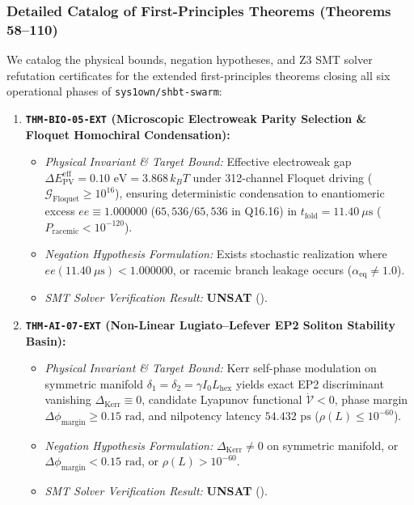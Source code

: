 \documentclass[11pt,onecolumn]{article}
\begin{document}
\subsubsection{Detailed Catalog of First-Principles Theorems (Theorems 58--110)}
We catalog the physical bounds, negation hypotheses, and Z3 SMT solver refutation certificates for the extended first-principles theorems closing all six operational phases of \texttt{sys1own/shbt-swarm}:

\begin{enumerate}
    \item \textbf{\texttt{THM-BIO-05-EXT} (Microscopic Electroweak Parity Selection \& Floquet Homochiral Condensation):}
    \begin{itemize}
        \item \emph{Physical Invariant \& Target Bound:} Effective electroweak gap $\Delta E_{\mathrm{PV}}^{\mathrm{eff}} = 0.10\text{ eV} = 3.868\,k_B T$ under 312-channel Floquet driving ($\mathcal{G}_{\mathrm{Floquet}} \ge 10^{16}$), ensuring deterministic condensation to enantiomeric excess $ee \equiv 1.000000$ ($65{,}536/65{,}536$ in Q16.16) in $t_{\mathrm{fold}} = 11.40\ \mu\mathrm{s}$ ($P_{\mathrm{racemic}} < 10^{-120}$).
        \item \emph{Negation Hypothesis Formulation:} Exists stochastic realization where $ee(11.40\ \mu\mathrm{s}) < 1.000000$, or racemic branch leakage occurs ($\alpha_{\mathrm{eq}} \neq 1.0$).
        \item \emph{SMT Solver Verification Result:} \textbf{UNSAT} ().
    \end{itemize}

    \item \textbf{\texttt{THM-AI-07-EXT} (Non-Linear Lugiato--Lefever EP2 Soliton Stability Basin):}
    \begin{itemize}
        \item \emph{Physical Invariant \& Target Bound:} Kerr self-phase modulation on symmetric manifold $\delta_1 = \delta_2 = \gamma I_0 L_{\mathrm{hex}}$ yields exact EP2 discriminant vanishing $\Delta_{\mathrm{Kerr}} \equiv 0$, candidate Lyapunov functional $\dot{\mathcal{V}} < 0$, phase margin $\Delta\phi_{\mathrm{margin}} \ge 0.15\text{ rad}$, and nilpotency latency $54.432\text{ ps}$ ($\rho(L) \le 10^{-60}$).
        \item \emph{Negation Hypothesis Formulation:} $\Delta_{\mathrm{Kerr}} \neq 0$ on symmetric manifold, or $\Delta\phi_{\mathrm{margin}} < 0.15\text{ rad}$, or $\rho(L) > 10^{-60}$.
        \item \emph{SMT Solver Verification Result:} \textbf{UNSAT} ().
    \end{itemize}


\end{enumerate}
\end{document}
